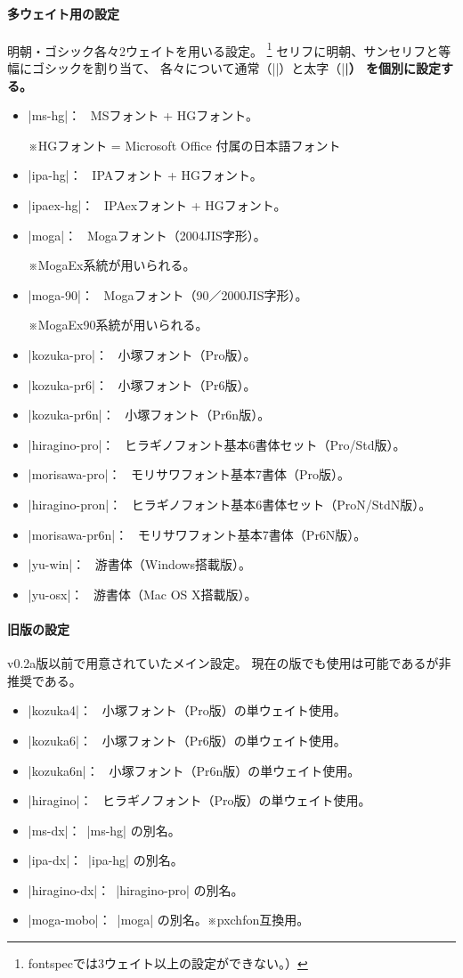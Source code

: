\documentclass[a4paper]{bxjsarticle}
\newcommand{\Pkg}[1]{\textsf{#1}}
\newcommand{\Note}{\par\noindent ※}
\newcommand{\Means}{：\ }
\begin{document}
\paragraph{多ウェイト用の設定}
明朝・ゴシック各々2ウェイトを用いる設定。%
\footnote{\Pkg{fontspec}では3ウェイト以上の設定ができない。）}
セリフに明朝、サンセリフと等幅にゴシックを割り当て、
各々について通常（|\mdseries|）と太字（|\bfseries|）
を個別に設定する。
\begin{itemize}
\item |ms-hg|\Means
  MSフォント + HGフォント。
  \Note HGフォント = Microsoft Office 付属の日本語フォント
\item |ipa-hg|\Means
  IPAフォント + HGフォント。
\item |ipaex-hg|\Means
  IPAexフォント + HGフォント。
\item |moga|\Means
  Mogaフォント（2004JIS字形）。
  \Note MogaEx系統が用いられる。
\item |moga-90|\Means
  Mogaフォント（90／2000JIS字形）。
  \Note MogaEx90系統が用いられる。
\item |kozuka-pro|\Means
  小塚フォント（Pro版）。
\item |kozuka-pr6|\Means
  小塚フォント（Pr6版）。
\item |kozuka-pr6n|\Means
  小塚フォント（Pr6n版）。
\item |hiragino-pro|\Means
  ヒラギノフォント基本6書体セット（Pro/Std版）。
\item |morisawa-pro|\Means
  モリサワフォント基本7書体（Pro版）。
\item |hiragino-pron|\Means
  ヒラギノフォント基本6書体セット（ProN/StdN版）。
\item |morisawa-pr6n|\Means
  モリサワフォント基本7書体（Pr6N版）。
\item |yu-win|\Means
  游書体（Windows搭載版）。
\item |yu-osx|\Means
  游書体（Mac OS X搭載版）。
\end{itemize}

\paragraph{旧版の設定}

v0.2a版以前で用意されていたメイン設定。
現在の版でも使用は可能であるが非推奨である。

\begin{itemize}
\item |kozuka4|\Means
  小塚フォント（Pro版）の単ウェイト使用。
\item |kozuka6|\Means
  小塚フォント（Pr6版）の単ウェイト使用。
\item |kozuka6n|\Means
  小塚フォント（Pr6n版）の単ウェイト使用。
\item |hiragino|\Means
  ヒラギノフォント（Pro版）の単ウェイト使用。
\item |ms-dx|\Means |ms-hg| の別名。
\item |ipa-dx|\Means |ipa-hg| の別名。
\item |hiragino-dx|\Means |hiragino-pro| の別名。
\item |moga-mobo|\Means |moga| の別名。※\Pkg{pxchfon}互換用。
\end{itemize}
\end{document}
